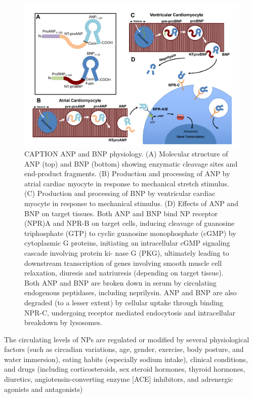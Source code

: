 \documentclass[14pt,a4paper,onecolumn]{extarticle}
\begin{document}
\begin{figure}      \centering      \includegraphics[scale=0.4]{../../images/NP_physiology.png}      \caption{CAPTION ANP and BNP physiology. (A) Molecular structure of ANP (top) and BNP (bottom) showing enzymatic cleavage sites and end-product fragments. (B) Production and processing of ANP by atrial cardiac myocyte in response to mechanical stretch stimulus. (C) Production and processing of BNP by ventricular cardiac myocyte in response to mechanical stimulus. (D) Effects of ANP and BNP on target tissues. Both ANP and BNP bind NP receptor (NPR)A and NPR-B on target cells, inducing cleavage of guanosine triphosphate (GTP) to cyclic guanosine monophosphate (cGMP) by cytoplasmic G proteins, initiating an intracellular cGMP signaling cascade involving protein ki- nase G (PKG), ultimately leading to downstream transcription of genes involving smooth muscle cell relaxation, diuresis and natriuresis (depending on target tissue). Both ANP and BNP are broken down in serum by circulating endogenous peptidases, including neprilysin. ANP and BNP are also degraded (to a lesser extent) by cellular uptake through binding NPR-C, undergoing receptor mediated endocytosis and intracellular breakdown by lysosomes. \citep{Maisel2018}}       \label{NP_physiology}  \end{figure}

The circulating levels of NPs are regulated or modified by several physiological factors (such as circadian variations, age, gender, exercise, body posture, and water immersion), eating habits (especially sodium intake), clinical conditions, and drugs (including corticosteroids, sex steroid hormones, thyroid hormones, diuretics, angiotensin-converting enzyme [ACE] inhibitors, and adrenergic agonists and antagonists) \citep{bib35} %
\end{document}
